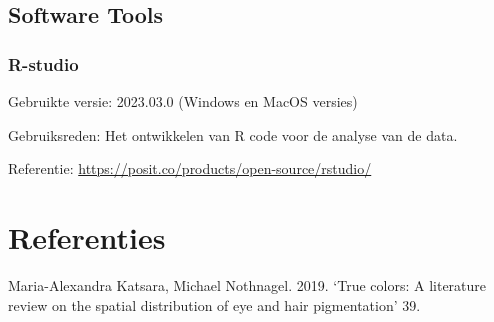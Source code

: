 \documentclass[
]{article}
\newlength{\cslhangindent}
\newlength{\cslentryspacingunit} %
\newenvironment{CSLReferences}[2] %
 {%
  \setlength{\parindent}{0pt}
  \ifodd #1
  \let\oldpar\par
  \def\par{\hangindent=\cslhangindent\oldpar}
  \fi
  \setlength{\parskip}{#2\cslentryspacingunit}
 }%
 {}
\begin{document}
\hypertarget{software-tools}{%
\subsection{Software Tools}\label{software-tools}}

\hypertarget{r-studio}{%
\subsubsection{R-studio}\label{r-studio}}

Gebruikte versie: 2023.03.0 (Windows en MacOS versies)

Gebruiksreden: Het ontwikkelen van R code voor de analyse van de data.

Referentie: \url{https://posit.co/products/open-source/rstudio/}

\hypertarget{referenties}{%
\section*{Referenties}\label{referenties}}

\hypertarget{refs}{}
\begin{CSLReferences}{1}{0}
\leavevmode{}%
Maria-Alexandra Katsara, Michael Nothnagel. 2019. {`True colors: A literature review on the spatial distribution of eye and hair pigmentation'} 39.

\end{CSLReferences}
\end{document}
